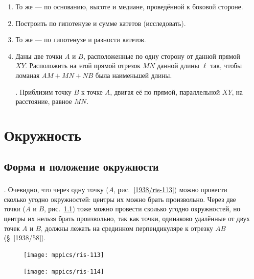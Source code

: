 \documentclass[oneside]{book}
\begin{document}
\begin{enumerate}[resume]
 \item
То же — по основанию, высоте и медиане, проведённой к боковой стороне.

 \item
Построить  по гипотенузе и сумме катетов (исследовать).

 \item
То же — по гипотенузе и разности катетов.

 \item
Даны две точки $A$ и $B$, расположенные по одну сторону от данной прямой $XY$.
Расположить на этой прямой отрезок $MN$ данной длины $\ell$ так, чтобы ломаная $AM+MN+NB$ была наименьшей длины.

.
Приблизим точку $B$ к точке $A$, двигая её по прямой, параллельной $XY$, на расстояние, равное $MN$.

\end{enumerate}

\chapter{Окружность}

\section{Форма и положение окружности}

\paragraph{}\label{1938/103}
.
Очевидно, что через одну точку ($A$, рис.~\ref{1938/ris-113}) можно провести сколько угодно окружностей:
центры их можно брать произвольно.
Через две точки ($A$ и $B$, рис.~\ref{1938/ris-114}) тоже можно провести сколько угодно окружностей, но центры их нельзя брать произвольно, так как точки, одинаково удалённые от двух точек $A$ и $B$, должны лежать на срединном перпендикуляре к отрезку $AB$ (§~\ref{1938/58}). 

\begin{figure}[h!]
\begin{minipage}{.48\textwidth}
\centering
\texttt{[image: mppics/ris-113]}
\caption{}\label{1938/ris-113}
\end{minipage}
\hfill
\begin{minipage}{.48\textwidth}
\centering
\texttt{[image: mppics/ris-114]}
\caption{}\label{1938/ris-114}
\end{minipage}
\end{figure}
\end{document}
